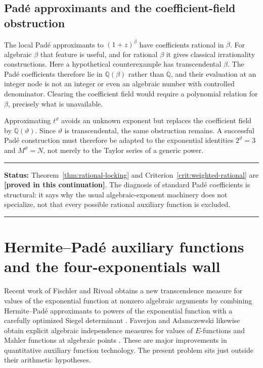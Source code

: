 \documentclass[11pt,oneside]{article}
\theoremstyle{definition}
\theoremstyle{remark}
\newcommand{\Q}{\mathbb Q}
\newcommand{\thetaq}{\vartheta}
\newcommand{\statusnew}{\textcolor{proofgreen}{\textbf{[proved in this continuation]}}}
\newenvironment{statusbox}[1]
{\begin{center}\begin{minipage}{0.94\textwidth}\raggedright\hrule\vspace{0.45em}\textbf{Status:} #1\par\vspace{0.35em}}
{\vspace{0.35em}\hrule\end{minipage}\end{center}}
\begin{document}
\subsection{Pad\'e approximants and the coefficient-field obstruction}

The local Pad\'e approximants to $(1+z)^\beta$ have coefficients rational in $\beta$.
For algebraic $\beta$ that feature is useful, and for rational $\beta$ it gives classical
irrationality constructions.  Here a hypothetical counterexample has transcendental
$\beta$.  The Pad\'e coefficients therefore lie in $\Q(\beta)$ rather than $\Q$, and their
evaluation at an integer node is not an integer or even an algebraic number with controlled
denominator.  Clearing the coefficient field would require a polynomial relation for
$\beta$, precisely what is unavailable.

Approximating $t^{\thetaq}$ avoids an unknown exponent but replaces the coefficient field by
$\Q(\thetaq)$.  Since $\thetaq$ is transcendental, the same obstruction remains.  A successful
Pad\'e construction must therefore be adapted to the exponential identities
$2^{\thetaq}=3$ and $M^{\thetaq}=N$, not merely to the Taylor series of a generic power.

\begin{statusbox}{Theorem~\ref{thm:rational-locking} and
Criterion~\ref{crit:weighted-rational} are \statusnew.  The diagnosis of standard Pad\'e
coefficients is structural: it says why the usual algebraic-exponent machinery does not
specialize, not that every possible rational auxiliary function is excluded.}
\end{statusbox}


\section{Hermite--Pad\'e auxiliary functions and the four-exponentials wall}
\label{sec:hermite-pade}

Recent work of Fischler and Rivoal obtains a new transcendence measure for values of the
exponential function at nonzero algebraic arguments by combining Hermite--Pad\'e approximants
to powers of the exponential function with a carefully optimized Siegel determinant
\cite{FischlerRivoal2025}.  Faverjon and Adamczewski likewise obtain explicit algebraic
independence measures for values of $E$-functions and Mahler functions at algebraic points
\cite{AdamczewskiFaverjon2025}.  These are major improvements in quantitative auxiliary
function technology.  The present problem sits just outside their arithmetic hypotheses.
\end{document}
